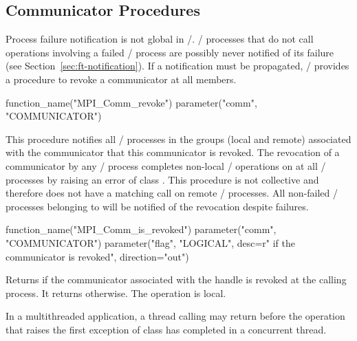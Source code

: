 \subsection{Communicator Procedures}
\label{sec:ft-functions:commfunctions}

\par Process failure notification is not global in \MPI/.
\MPI/ processes that do not call operations involving a failed \MPI/ process are
possibly never notified of its failure (see
Section~\ref{sec:ft-notification}). If a
notification must be propagated, \MPI/
provides a procedure to revoke a communicator at
all members.

\begin{mpi-binding}
    function_name("MPI_Comm_revoke")
    parameter("comm", "COMMUNICATOR")
\end{mpi-binding}

\par
This procedure notifies all \MPI/ processes in the groups (local and remote)
associated with the communicator  that this communicator
is revoked. The revocation of a communicator by any
\MPI/ process completes non-local \MPI/ operations on
 at all \MPI/ processes by raising an error of class
.
This procedure is not collective and
therefore does not have a matching call on remote \MPI/ processes. All
non-failed \MPI/ processes belonging to  will be notified of the
revocation despite failures.

\begin{mpi-binding}
    function_name("MPI_Comm_is_revoked")
    parameter("comm", "COMMUNICATOR")
    parameter("flag", "LOGICAL", desc=r" if the communicator is revoked", direction="out")
\end{mpi-binding}

\par
Returns  if the communicator associated with the handle  is revoked at the calling process. It returns  otherwise. The operation is local.

\begin{users}
    In a multithreaded application, a thread calling  may return  before the operation that raises the first exception of class  has completed in a concurrent thread.
\end{users}

